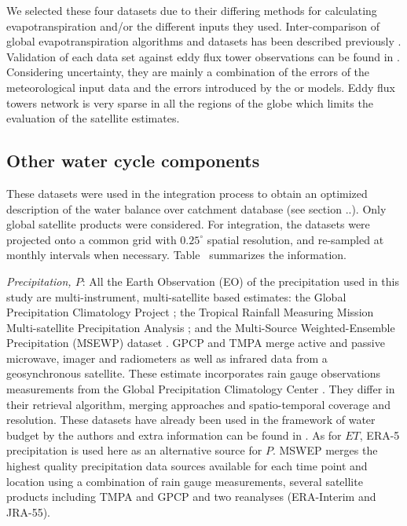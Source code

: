 \documentclass[draft]{agujournal2019}
\begin{document}
We selected these four datasets due to their differing methods for calculating evapotranspiration and/or the different inputs they used. 
Inter-comparison of global evapotranspiration algorithms and datasets has been described previously \cite{Michel2016}. 
Validation of each data set against eddy flux tower observations can be found in \cite{Miralles2011,Mu2011}. 
Considering uncertainty, they are mainly a combination of the errors of the meteorological input data and the errors introduced by the \cite{PRIESTLEY1972} or \cite{PENMAN1948,Monteith1965} models. 
Eddy flux towers network is very sparse in all the regions of the globe which limits the evaluation of the satellite estimates.

\subsection{Other water cycle components}

These datasets were used in the integration process to obtain an optimized description of the water balance over catchment database (see section ..). Only global satellite products were considered. For integration, the datasets were projected onto a common grid with $0.25^\circ$ spatial resolution, and re-sampled at monthly intervals when necessary. Table~\label{table1} summarizes the information. 


{\it Precipitation, $P$}: All the Earth Observation (EO) of the precipitation used in this study are multi-instrument, multi-satellite based estimates: the Global Precipitation Climatology Project \cite{Adler2003}; the Tropical Rainfall Measuring Mission Multi-satellite Precipitation Analysis \cite{Huffman2007};  and the Multi-Source Weighted-Ensemble Precipitation (MSEWP) dataset \cite{Beck2017}. GPCP and TMPA merge active and passive microwave,  imager and radiometers  as well as infrared data from a geosynchronous satellite. These estimate incorporates rain gauge observations measurements from the Global Precipitation Climatology Center \cite{Schneider2011, Schneider2014b}. They differ in their retrieval algorithm, merging approaches and spatio-temporal coverage and resolution. These datasets have already been used in the framework of water budget by the authors and extra information can be found in \cite{Pellet2020c}. As for $ET$, ERA-5 precipitation is used here as an alternative source for $P$. MSWEP merges the highest quality precipitation data sources available for each time point and location using a combination of rain gauge measurements, several satellite products including TMPA and GPCP and two reanalyses (ERA-Interim and JRA-55). 
\end{document}

